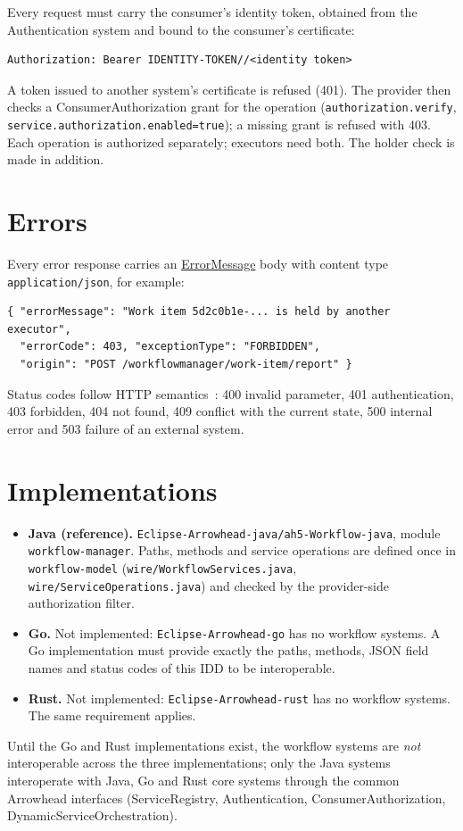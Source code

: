 \documentclass[a4paper]{arrowhead}
\newcommand{\mref}[1]{{\textcolor{ArrowheadPurple}{\hyperref[sec:model:#1]{#1}}}}
\begin{document}
Every request must carry the consumer's identity token, obtained from the Authentication system and bound to the
consumer's certificate:
\begin{lstlisting}
Authorization: Bearer IDENTITY-TOKEN//<identity token>
\end{lstlisting}
A token issued to another system's certificate is refused (401). The provider then checks a ConsumerAuthorization
grant for the operation (\texttt{authorization.\allowbreak{}verify}, \texttt{service.\allowbreak{}authorization.\allowbreak{}enabled=\allowbreak{}true}); a missing grant is
refused with 403. Each operation is authorized separately; executors need both. The holder check is made in addition.


\section{Errors}
\label{sec:errors}
Every error response carries an \mref{ErrorMessage} body with content type \texttt{application/\allowbreak{}json}, for example:
\begin{lstlisting}
{ "errorMessage": "Work item 5d2c0b1e-... is held by another executor",
  "errorCode": 403, "exceptionType": "FORBIDDEN",
  "origin": "POST /workflowmanager/work-item/report" }
\end{lstlisting}
Status codes follow HTTP semantics~\cite{rfc9110}: 400 invalid parameter, 401 authentication, 403 forbidden, 404 not
found, 409 conflict with the current state, 500 internal error and 503 failure of an external system.


\section{Implementations}
\label{sec:implementations}
\begin{itemize}
\item \textbf{Java (reference).} \texttt{Eclipse-\allowbreak{}Arrowhead-\allowbreak{}java/\allowbreak{}ah5-\allowbreak{}Workflow-\allowbreak{}java}, module \texttt{workflow-\allowbreak{}manager}. Paths, methods and service
operations are defined once in \texttt{workflow-\allowbreak{}model} (\texttt{wire/\allowbreak{}Workflow\allowbreak{}Services.\allowbreak{}java}, \texttt{wire/\allowbreak{}Service\allowbreak{}Operations.\allowbreak{}java}) and checked by the provider-side authorization filter.
\item \textbf{Go.} Not implemented: \texttt{Eclipse-\allowbreak{}Arrowhead-\allowbreak{}go} has no workflow systems. A Go implementation must
provide exactly the paths, methods, JSON field names and status codes of this IDD to be interoperable.
\item \textbf{Rust.} Not implemented: \texttt{Eclipse-\allowbreak{}Arrowhead-\allowbreak{}rust} has no workflow systems. The same requirement applies.
\end{itemize}
Until the Go and Rust implementations exist, the workflow systems are \emph{not} interoperable across the three
implementations; only the Java systems interoperate with Java, Go and Rust core systems through the common Arrowhead
interfaces (ServiceRegistry, Authentication, ConsumerAuthorization, DynamicServiceOrchestration).
\end{document}
